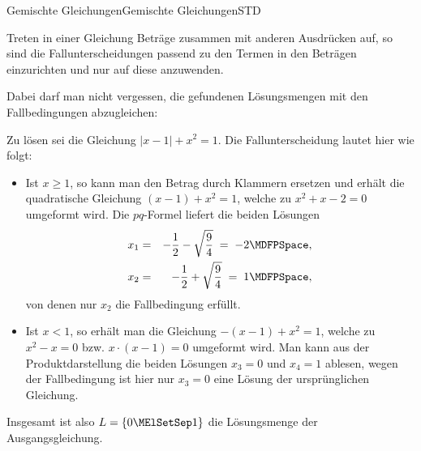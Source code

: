 \begin{MXContent}{Gemischte Gleichungen}{Gemischte Gleichungen}{STD}

\begin{MInfo}
Treten in einer Gleichung Beträge zusammen mit anderen Ausdrücken auf, so sind die Fallunterscheidungen passend zu den Termen in den Beträgen einzurichten und nur auf diese anzuwenden.
\end{MInfo}

Dabei darf man nicht vergessen, die gefundenen Lösungsmengen mit den Fallbedingungen abzugleichen:

\begin{MExample}
Zu lösen sei die Gleichung $|x-1|+x^2=1$. Die Fallunterscheidung lautet hier wie folgt:
\begin{itemize}
\item{Ist $x\geq 1$, so kann man den Betrag durch Klammern ersetzen und erhält die quadratische Gleichung $(x-1)+x^2=1$, welche zu $x^2+x-2=0$ umgeformt wird. Die $p q$-Formel liefert die beiden Lösungen
\begin{eqnarray*}
x_1 & =& -\Mdfrac12-\sqrt{\Mdfrac94}\;=\; -2 \MDFPSpace, \\
x_2 & =& -\Mdfrac12+\sqrt{\Mdfrac94}\;=\; 1 \MDFPSpace,
\end{eqnarray*}
von denen nur $x_2$ die Fallbedingung erfüllt.
}
\item{Ist $x<1$, so erhält man die Gleichung $-(x-1)+x^2=1$, welche zu $x^2-x=0$ bzw. $x\cdot (x-1)=0$ umgeformt wird. Man kann aus der Produktdarstellung die beiden Lösungen $x_3=0$ und $x_4=1$ ablesen,
wegen der Fallbedingung ist hier nur $x_3=0$ eine Lösung der ursprünglichen Gleichung.
}
\end{itemize}
Insgesamt ist also $\ML=\lbrace 0\MElSetSep 1\rbrace$ die Lösungsmenge der Ausgangsgleichung.
\end{MExample}


\end{MXContent}
